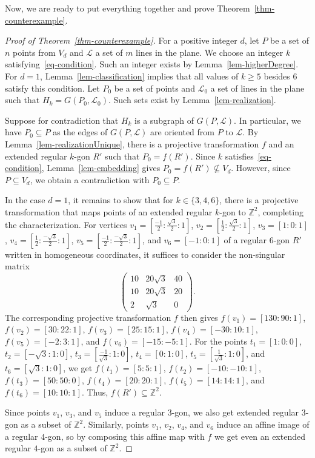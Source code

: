 \documentclass{article}
\begin{document}
Now, we are ready to put everything together and prove Theorem~\ref{thm-counterexample}.

\begin{proof}[Proof of Theorem~\ref{thm-counterexample}]
For a positive integer $d$, let $P$ be a set of $n$ points from $V_d$ and $\mathcal{L}$ a set of $m$ lines in the plane.
We choose an integer $k$ satisfying~\eqref{eq-condition}.
Such an integer exists by Lemma~\ref{lem-higherDegree}.
For $d=1$, Lemma~\ref{lem-classification} implies that all values of $k \geq 5$ besides 6 satisfy this condition.
Let $P_0$ be a set of points and $\mathcal{L}_0$ a set of lines in the plane such that $H_k=G(P_0,\mathcal{L}_0)$.
Such sets exist by Lemma~\ref{lem-realization}.

Suppose for contradiction that $H_k$ is a subgraph of $G(P,\mathcal{L})$.
In particular, we have $P_0 \subseteq P$ as the edges of $G(P,\mathcal{L})$ are oriented from $P$ to $\mathcal{L}$.
By Lemma~\ref{lem-realizationUnique}, there is a projective transformation $f$ and an extended regular $k$-gon $R'$ such that $P_0 = f(R')$.
Since $k$ satisfies~\eqref{eq-condition}, Lemma~\ref{lem-embedding} gives $P_0=f(R') \not\subseteq V_d$.
However, since $P \subseteq V_d$, we obtain a contradiction with $P_0 \subseteq P$.

In the case $d=1$, it remains to show that for $k \in \{3,4,6\}$, there is a projective transformation that maps points of an extended regular $k$-gon to $\mathbb{Z}^2$, completing the characterization.
For vertices $v_1=[\frac{-1}{2}:\frac{\sqrt{3}}{2}:1]$, $v_2=[\frac{1}{2}:\frac{\sqrt{3}}{2}:1]$, $v_3=[1:0:1]$, $v_4=[\frac{1}{2}:\frac{-\sqrt{3}}{2}:1]$, $v_5=[\frac{-1}{2}:\frac{-\sqrt{3}}{2}:1]$, and $v_6=[-1:0:1]$ of a regular $6$-gon $R'$ written in homogeneous coordinates, it suffices to consider the non-singular matrix \[\begin{pmatrix}10 & 20\sqrt{3} & 40\\10 & 20\sqrt{3}& 20 \\ 2 & \sqrt{3} & 0\end{pmatrix}.\]
The corresponding projective transformation $f$ then gives $f(v_1)=[130:90:1]$, $f(v_2)=[30:22:1]$, $f(v_3)=[25:15:1]$, $f(v_4)=[-30:10:1]$, $f(v_5)=[-2:3:1]$, and $f(v_6)=[-15:-5:1]$.
For the points $t_1=[1:0:0]$, $t_2=[-\sqrt{3}:1:0]$, $t_3=[\frac{-1}{\sqrt{3}}:1:0]$, $t_4=[0:1:0]$, $t_5=[\frac{1}{\sqrt{3}}:1:0]$, and $t_6=[\sqrt{3}:1:0]$, we get $f(t_1)=[5:5:1]$, $f(t_2)=[-10:-10:1]$, $f(t_3)=[50:50:0]$, $f(t_4)=[20:20:1]$, $f(t_5)=[14:14:1]$, and $f(t_6)=[10:10:1]$.
Thus, $f(R') \subseteq \mathbb{Z}^2$.

Since points $v_1$, $v_3$, and $v_5$ induce a regular $3$-gon, we also get extended regular $3$-gon as a subset of $\mathbb{Z}^2$.
Similarly, points $v_1$, $v_2$, $v_4$, and $v_6$ induce an affine image of a regular $4$-gon, so by composing this affine map with $f$ we get even an extended regular $4$-gon as a subset of $\mathbb{Z}^2$.
\end{proof}
\end{document}
